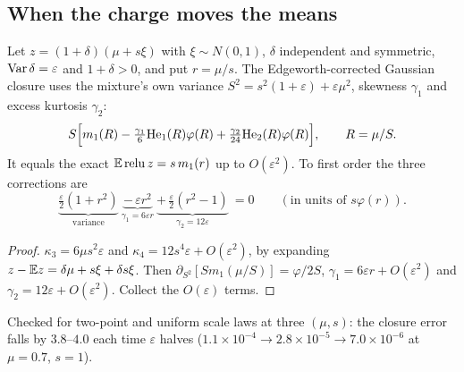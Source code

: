 \subsection{When the charge moves the means}
\begin{theorem}\label{thm:cancel}
Let $z=(1+\delta)(\mu+s\xi)$ with $\xi\sim N(0,1)$, $\delta$ independent and symmetric, $\operatorname{Var}\delta=\varepsilon$ and $1+\delta>0$, and put $r=\mu/s$. The
Edgeworth-corrected Gaussian closure uses the mixture's own variance $S^2=s^2(1+\varepsilon)+\varepsilon\mu^2$, skewness $\gamma_1$ and excess
kurtosis $\gamma_2$:
\[
S\Big[m_1(R)-\tfrac{\gamma_1}6\mathrm{He}_1(R)\varphi(R)+\tfrac{\gamma_2}{24}\mathrm{He}_2(R)\varphi(R)\Big],\qquad R=\mu/S.
\]
It equals the exact $\mathbb E\operatorname{relu} z=s\,m_1(r)$ up to $O(\varepsilon^2)$. To first order the three corrections are
\[
\underbrace{\tfrac\varepsilon2(1+r^2)}_{\text{variance}}\ \underbrace{-\,\varepsilon r^2}_{\gamma_1=6\varepsilon r}\ \underbrace{+\,\tfrac\varepsilon2(r^2-1)}_{\gamma_2=12\varepsilon}\ =0
\qquad(\text{in units of }s\varphi(r)).
\]
\end{theorem}
\begin{proof}
$\kappa_3=6\mu s^2\varepsilon$ and $\kappa_4=12s^4\varepsilon+O(\varepsilon^2)$, by expanding $z-\mathbb E z=\delta\mu+s\xi+\delta s\xi$. Then
$\partial_{S^2}[Sm_1(\mu/S)]=\varphi/2S$, $\gamma_1=6\varepsilon r+O(\varepsilon^2)$ and $\gamma_2=12\varepsilon+O(\varepsilon^2)$. Collect the $O(\varepsilon)$ terms.
\end{proof}
Checked for two-point and uniform scale laws at three $(\mu,s)$: the closure error falls by $3.8$--$4.0$ each time $\varepsilon$ halves
($1.1\times10^{-4}\to2.8\times10^{-5}\to7.0\times10^{-6}$ at $\mu=0.7$, $s=1$).

